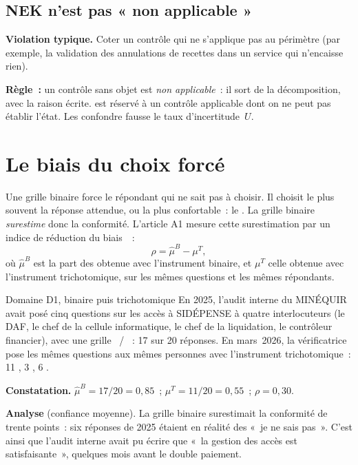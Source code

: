 \subsection{NEK n'est pas « non applicable »}

\begin{boxalert}
\textbf{Violation typique.} Coter \NEK{} un contrôle qui ne s'applique pas au
périmètre (par exemple, la validation des annulations de recettes dans un
service qui n'encaisse rien).

\smallskip
\textbf{Règle~:} un contrôle sans objet est \emph{non applicable}~: il sort
de la décomposition, avec la raison écrite. \NEK{} est réservé à un contrôle
applicable dont on ne peut pas établir l'état. Les confondre fausse le taux
d'incertitude~$U$.
\end{boxalert}

\separateur

\section{Le biais du choix forcé}
\label{sec:c07-biais}

Une grille binaire force le répondant qui ne sait pas à choisir. Il choisit
le plus souvent la réponse attendue, ou la plus confortable~: le \OUI{}.
La grille binaire \emph{surestime} donc la conformité. L'article A1 mesure
cette surestimation par un indice de réduction du biais~\cite{minka2026nek}~:
\[
    \rho = \hat{\mu}^{B} - \mu^{T},
\]
où $\hat{\mu}^{B}$ est la part des \OUI{} obtenue avec l'instrument binaire, et
$\mu^{T}$ celle obtenue avec l'instrument trichotomique, sur les mêmes
questions et les mêmes répondants.

\begin{boxlecture}{Domaine D1, binaire puis trichotomique}
En 2025, l'audit interne du MINÉQUIR avait posé cinq questions sur les accès
à SIDÉPENSE à quatre interlocuteurs (le DAF, le chef de la cellule
informatique, le chef de la liquidation, le contrôleur financier), avec une
grille \OUI{}~/ \NON{}~: 17 \OUI{} sur 20 réponses. En mars~2026, la
vérificatrice pose les mêmes questions aux mêmes personnes avec
l'instrument trichotomique~: 11 \OUI{}, 3 \NON{}, 6 \NEK{}.

\medskip
\textbf{Constatation.} $\hat{\mu}^{B} = 17/20 = 0{,}85$~; $\mu^{T} = 11/20 =
0{,}55$~; $\rho = 0{,}30$.

\medskip
\textbf{Analyse} (confiance moyenne). La grille binaire surestimait la
conformité de trente points~: six réponses \OUI{} de 2025 étaient en
réalité des «~je ne sais pas~». C'est ainsi que l'audit interne avait pu
écrire que «~la gestion des accès est satisfaisante~», quelques mois avant
le double paiement.

\medskip
\hfill{}
\end{boxlecture}

